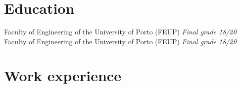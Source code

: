 \documentclass[letterpaper]{twentysecondcv} %
\begin{document}

\section{Education}

\begin{twenty}
    {Faculty of Engineering of the University of Porto (FEUP)}
    {\emph{Final grade 18/20}}
    {Faculty of Engineering of the University of Porto (FEUP)}
    {\emph{Final grade 18/20}}
\end{twenty}

\vfill


\section{Work experience}
\end{document}

